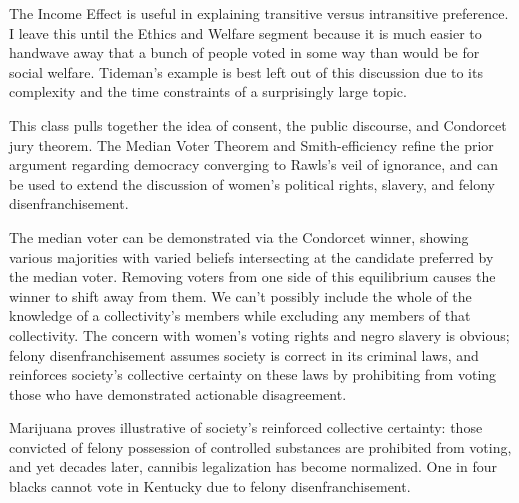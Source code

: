 \begin{boxcomment}
    The Income Effect is useful in explaining transitive versus intransitive preference.  I leave this until the Ethics and Welfare segment because it is much easier to handwave away that a bunch of people voted in some way than would be for social welfare.  Tideman's example is best left out of this discussion due to its complexity and the time constraints of a surprisingly large topic.
\end{boxcomment}

\begin{boxcomment}
    This class pulls together the idea of consent, the public discourse, and Condorcet jury theorem.  The Median Voter Theorem and Smith-efficiency refine the prior argument regarding democracy converging to Rawls's veil of ignorance, and can be used to extend the discussion of women's political rights, slavery, and felony disenfranchisement.

    The median voter can be demonstrated via the Condorcet winner, showing various majorities with varied beliefs intersecting at the candidate preferred by the median voter.  Removing voters from one side of this equilibrium causes the winner to shift away from them.  We can't possibly include the whole of the knowledge of a collectivity's members while excluding any members of that collectivity.  The concern with women's voting rights and negro slavery is obvious; felony disenfranchisement assumes society is correct in its criminal laws, and reinforces society's collective certainty on these laws by prohibiting from voting those who have demonstrated actionable disagreement.

    Marijuana proves illustrative of society's reinforced collective certainty:  those convicted of felony possession of controlled substances are prohibited from voting, and yet decades later, cannibis legalization has become normalized.  One in four blacks cannot vote in Kentucky due to felony disenfranchisement.
\end{boxcomment}